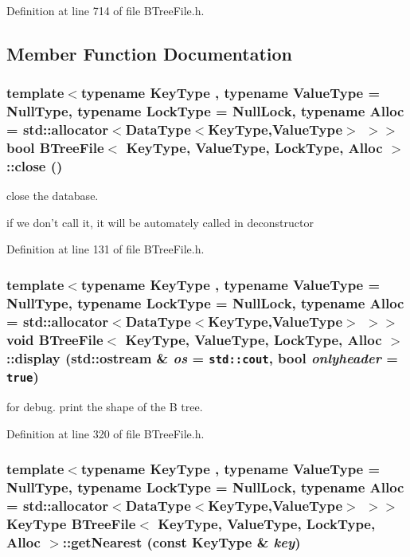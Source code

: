 Definition at line 714 of file BTreeFile.h.

\subsection{Member Function Documentation}
\hypertarget{classBTreeFile_1602f96ee8ffe4db45f563b7eaef1a17}{
\subsubsection[{close}]{\setlength{\rightskip}{0pt plus 5cm}template$<$typename KeyType , typename ValueType  = NullType, typename LockType  = NullLock, typename Alloc  = std::allocator$<$DataType$<$KeyType,ValueType$>$ $>$$>$ bool {\bf BTreeFile}$<$ KeyType, ValueType, LockType, Alloc $>$::close ()}}
\label{classBTreeFile_1602f96ee8ffe4db45f563b7eaef1a17}


close the database. 

if we don't call it, it will be automately called in deconstructor 

Definition at line 131 of file BTreeFile.h.\hypertarget{classBTreeFile_005fb40d2dbb29e75ef0a0a7a4faa71d}{
\subsubsection[{display}]{\setlength{\rightskip}{0pt plus 5cm}template$<$typename KeyType , typename ValueType  = NullType, typename LockType  = NullLock, typename Alloc  = std::allocator$<$DataType$<$KeyType,ValueType$>$ $>$$>$ void {\bf BTreeFile}$<$ KeyType, ValueType, LockType, Alloc $>$::display (std::ostream \& {\em os} = {\tt std::cout}, \/  bool {\em onlyheader} = {\tt true})}}
\label{classBTreeFile_005fb40d2dbb29e75ef0a0a7a4faa71d}


for debug. print the shape of the B tree. 

Definition at line 320 of file BTreeFile.h.\hypertarget{classBTreeFile_05829fd2f39c24fe36b5a3a395437de9}{
\subsubsection[{getNearest}]{\setlength{\rightskip}{0pt plus 5cm}template$<$typename KeyType , typename ValueType  = NullType, typename LockType  = NullLock, typename Alloc  = std::allocator$<$DataType$<$KeyType,ValueType$>$ $>$$>$ KeyType {\bf BTreeFile}$<$ KeyType, ValueType, LockType, Alloc $>$::getNearest (const KeyType \& {\em key})}}
\label{classBTreeFile_05829fd2f39c24fe36b5a3a395437de9}


